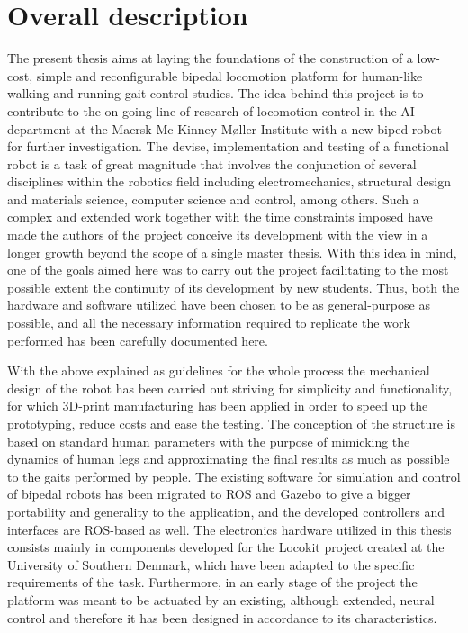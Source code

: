
\section{Overall description}
\label{sec:overall_description}
The present thesis aims at laying the foundations of the construction of a low-cost, simple and reconfigurable bipedal locomotion platform for human-like walking and running gait control studies. 
The idea behind this project is to contribute to the on-going line of research of locomotion control in the AI department at the Maersk Mc-Kinney Møller Institute with a new biped robot for further investigation.
The devise, implementation and testing of a functional robot is a task of great magnitude that involves the conjunction of several disciplines within the robotics field including electromechanics, structural design and materials science, computer science and control, among others.
Such a complex and extended work together with the time constraints imposed have made the authors of the project conceive its development with the view in a longer growth beyond the scope of a single master thesis.
With this idea in mind, one of the goals aimed here was to carry out the project facilitating to the most possible extent the continuity of its development by new students. 
Thus, both the hardware and software utilized have been chosen to be as general-purpose as possible, and all the necessary information required to replicate the work performed has been carefully documented here.

With the above explained as guidelines for the whole process the mechanical design of the robot has been carried out striving for simplicity and functionality, for which 3D-print manufacturing has been applied in order to speed up the prototyping, reduce costs and ease the testing.
The conception of the structure is based on standard human parameters with the purpose of mimicking the dynamics of human legs and approximating the final results as much as possible to the gaits performed by people.
The existing software for simulation and control of bipedal robots has been migrated to ROS \cite{ros} and Gazebo \cite{gazebo} to give a bigger portability and generality to the application, and the developed controllers and interfaces are ROS-based as well. 
The electronics hardware utilized in this thesis consists mainly in components developed for the Locokit project \cite{locokit} created at the University of Southern Denmark, which have been adapted to the specific requirements of the task.
Furthermore, in an early stage of the project the platform was meant to be actuated by an existing, although extended, neural control and therefore it has been designed in accordance to its characteristics.